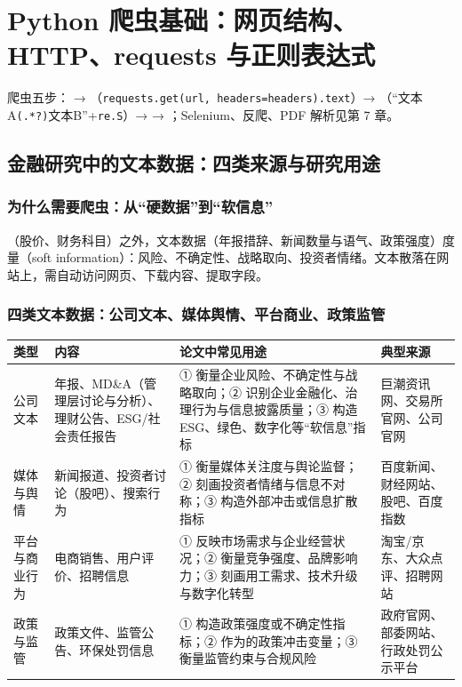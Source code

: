\chapter{Python 爬虫基础：网页结构、HTTP、requests 与正则表达式}
\noindent{}\quad 爬虫五步： → （\texttt{requests.get(url, headers=headers).text}）→ （“文本A\texttt{(.*?)}文本B”+\texttt{re.S}）→  → ；Selenium、反爬、PDF 解析见第 7 章。

\section{金融研究中的文本数据：四类来源与研究用途}

\subsection{为什么需要爬虫：从“硬数据”到“软信息”}
（股价、财务科目）之外，文本数据（年报措辞、新闻数量与语气、政策强度）度量（soft information）：风险、不确定性、战略取向、投资者情绪。文本散落在网站上，需自动访问网页、下载内容、提取字段。

\subsection{四类文本数据：公司文本、媒体舆情、平台商业、政策监管}
\begin{center}\footnotesize\renewcommand{\arraystretch}{1.0}
\begin{tabularx}{\linewidth}{@{}p{1.6cm}p{3.2cm}Lp{3.2cm}@{}}
\toprule
类型 & 内容 & 论文中常见用途 & 典型来源 \\
\midrule
公司文本 & 年报、MD\&A（管理层讨论与分析）、理财公告、ESG/社会责任报告 & ① 衡量企业风险、不确定性与战略取向；② 识别企业金融化、治理行为与信息披露质量；③ 构造 ESG、绿色、数字化等“软信息”指标 & 巨潮资讯网、交易所官网、公司官网 \\
媒体与舆情 & 新闻报道、投资者讨论（股吧）、搜索行为 & ① 衡量媒体关注度与舆论监督；② 刻画投资者情绪与信息不对称；③ 构造外部冲击或信息扩散指标 & 百度新闻、财经网站、股吧、百度指数 \\
平台与商业行为 & 电商销售、用户评价、招聘信息 & ① 反映市场需求与企业经营状况；② 衡量竞争强度、品牌影响力；③ 刻画用工需求、技术升级与数字化转型 & 淘宝/京东、大众点评、招聘网站 \\
政策与监管 & 政策文件、监管公告、环保处罚信息 & ① 构造政策强度或不确定性指标；② 作为的政策冲击变量；③ 衡量监管约束与合规风险 & 政府官网、部委网站、行政处罚公示平台 \\
\bottomrule
\end{tabularx}
\end{center}

